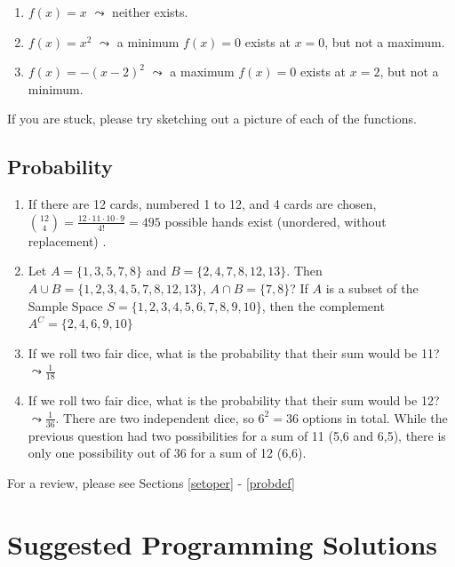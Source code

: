 \documentclass[
]{book}
\providecommand{\tightlist}{%
  \setlength{\itemsep}{0pt}\setlength{\parskip}{0pt}}
\theoremstyle{definition}
\theoremstyle{definition}
\theoremstyle{definition}
\theoremstyle{definition}
\theoremstyle{remark}
\begin{document}
\begin{enumerate}
\def\labelenumi{\arabic{enumi}.}
\tightlist
\item
  \(f(x) = x\) \(\leadsto\) neither exists.
\item
  \(f(x) = x^2\) \(\leadsto\) a minimum \(f(x) = 0\) exists at \(x = 0\), but not a maximum.
\item
  \(f(x) = -(x - 2)^2\) \(\leadsto\) a maximum \(f(x) = 0\) exists at \(x = 2\), but not a minimum.
\end{enumerate}

If you are stuck, please try sketching out a picture of each of the functions.

\hypertarget{probability-1}{%
\section*{Probability}\label{probability-1}}

\begin{enumerate}
\def\labelenumi{\arabic{enumi}.}
\item
  If there are 12 cards, numbered 1 to 12, and 4 cards are chosen, \(\binom{12}{4} = \frac{12\cdot 11\cdot 10\cdot 9}{4!} = 495\) possible hands exist (unordered, without replacement) .
\item
  Let \(A = \{1,3,5,7,8\}\) and \(B = \{2,4,7,8,12,13\}\). Then \(A \cup B = \{1, 2, 3, 4, 5, 7, 8, 12, 13\}\), \(A \cap B = \{7, 8\}\)? If \(A\) is a subset of the Sample Space \(S = \{1,2,3,4,5,6,7,8,9,10\}\), then the complement \(A^C = \{2, 4, 6, 9, 10\}\)
\item
  If we roll two fair dice, what is the probability that their sum would be 11? \(\leadsto \frac{1}{18}\)
\item
  If we roll two fair dice, what is the probability that their sum would be 12? \(\leadsto \frac{1}{36}\). There are two independent dice, so \(6^2 = 36\) options in total. While the previous question had two possibilities for a sum of 11 (5,6 and 6,5), there is only one possibility out of 36 for a sum of 12 (6,6).
\end{enumerate}

For a review, please see Sections \ref{setoper} - \ref{probdef}

\hypertarget{suggested-programming-solutions}{%
\chapter*{Suggested Programming Solutions}\label{suggested-programming-solutions}}
\end{document}
